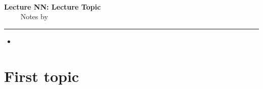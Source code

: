 \documentclass[11pt]{article}
\newcommand{\lecnum}{NN}
\newcommand{\lectopic}{Lecture Topic}
\newcommand{\lecdate}{}                       %
\begin{document}
\begin{center}
  {\small\scshape \coursename}\\[1ex]
  {\LARGE\bfseries Lecture \lecnum: \lectopic}\\[1ex]
  {\small \instructor\ifx\lecdate\empty\else\ \textbullet\ \lecdate\fi
    \ \textbullet\ Notes by \studentname}
\end{center}
\hrule\bigskip

\begin{keyidea}[Summary]
  \begin{itemize}[nosep]
    \item
  \end{itemize}
\end{keyidea}

\section{First topic}

%
%

\end{document}
